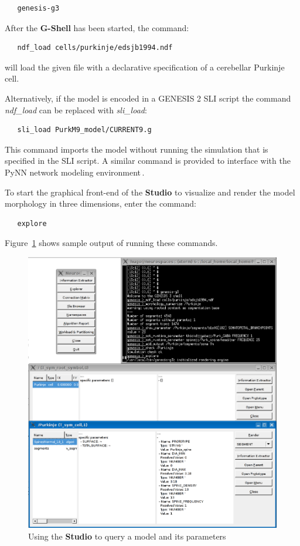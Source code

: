 \documentclass[12pt]{article}
\begin{document}
{\footnotesize
\begin{verbatim}
   genesis-g3
\end{verbatim}
}

After the {\bf G-Shell} has been started, the command:

{\footnotesize
\begin{verbatim}
   ndf_load cells/purkinje/edsjb1994.ndf
\end{verbatim}
}

will load the given file with a declarative specification of a
cerebellar Purkinje cell.

Alternatively, if the model is encoded in a GENESIS 2 SLI script the
command {\it ndf\_load} can be replaced with {\it sli\_load}:

{\footnotesize
\begin{verbatim}
   sli_load PurkM9_model/CURRENT9.g
\end{verbatim}
}

This command imports the model without running the simulation that is specified in
the SLI script.  A similar command is provided to interface with the
PyNN network modeling environment\,\cite{andrew08:_pynn}.

To start the graphical front-end of the {\bf Studio} to
visualize and render the model morphology in three dimensions, enter the
command:

{\footnotesize
\begin{verbatim}
   explore
\end{verbatim}
}

Figure~\ref{fig:cbi-studio} shows sample output of running these
commands.

\begin{figure}[ht]
  \centering
  \includegraphics[scale=0.3]{figures/studio-screenshot.eps}
  \caption{Using the {\bf Studio} to query a model and its
    parameters}
  \label{fig:cbi-studio}
\end{figure}
\end{document}
